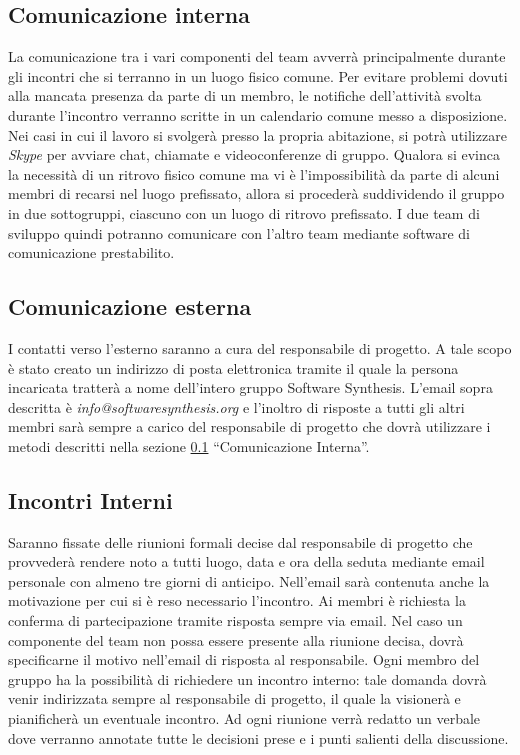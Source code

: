 \subsection{Comunicazione interna}
\label{sec:comunicazione_interna}
La comunicazione tra i vari componenti del team avverrà principalmente durante gli incontri che si terranno in un luogo fisico comune. Per evitare problemi dovuti alla mancata presenza da parte di un membro, le notifiche dell'attività svolta durante l'incontro verranno scritte in un calendario comune messo a disposizione.
Nei casi in cui il lavoro si svolgerà presso la propria abitazione, si potrà utilizzare \textit{Skype} per avviare chat, chiamate e videoconferenze di gruppo.
Qualora si evinca la necessità di un ritrovo fisico comune ma vi è l'impossibilità da parte di alcuni membri di recarsi nel luogo prefissato, allora si procederà suddividendo il gruppo in due sottogruppi, ciascuno con un luogo di ritrovo prefissato. I due team di sviluppo quindi potranno comunicare con l'altro team mediante software di comunicazione prestabilito.


\subsection{Comunicazione esterna}
I contatti verso l'esterno saranno a cura del responsabile di progetto. A tale scopo è stato creato un indirizzo di posta elettronica tramite il quale la persona incaricata tratterà a nome dell'intero gruppo Software Synthesis. L'email sopra descritta è \textit{info@softwaresynthesis.org} e l'inoltro di risposte a tutti gli altri membri sarà sempre a carico del responsabile di progetto che dovrà utilizzare i metodi descritti nella sezione \ref{sec:comunicazione_interna} ``Comunicazione Interna''.

\subsection{Incontri Interni}
Saranno fissate delle riunioni formali decise dal responsabile di progetto che provvederà rendere noto a tutti luogo, data e ora della seduta mediante email personale con almeno tre giorni di anticipo. Nell'email sarà contenuta anche la motivazione per cui si è reso necessario l'incontro. Ai membri è richiesta la conferma di partecipazione tramite risposta sempre via email. Nel caso un componente del team non possa essere presente alla riunione decisa, dovrà specificarne il motivo nell'email di risposta al responsabile.
Ogni membro del gruppo ha la possibilità di richiedere un incontro interno: tale domanda dovrà venir indirizzata sempre al responsabile di progetto, il quale la visionerà e pianificherà un eventuale incontro.
Ad ogni riunione verrà redatto un verbale dove verranno annotate tutte le decisioni prese e i punti salienti della discussione.

